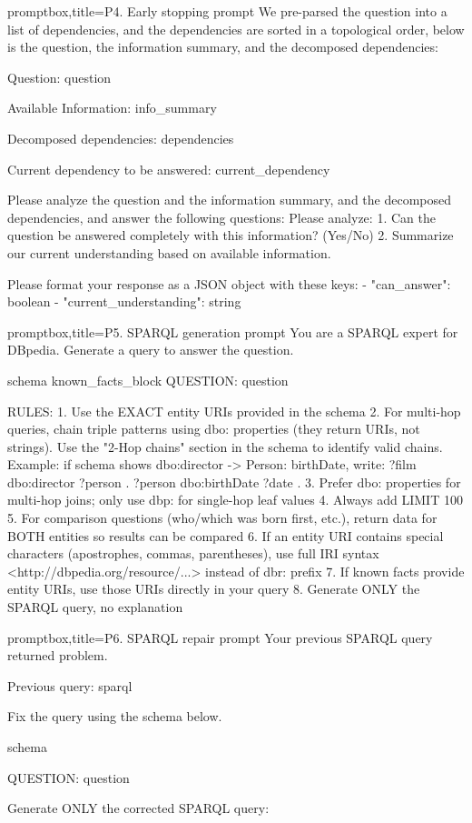 \documentclass[11pt]{article}
\begin{document}
\begin{tcblisting}{promptbox,title={P4. Early stopping prompt}}
We pre-parsed the question into a list of dependencies, and the dependencies are sorted in a topological order, below is the question, the information summary, and the decomposed dependencies:

Question: {question}

Available Information:
{info_summary}

Decomposed dependencies:
{dependencies}

Current dependency to be answered:
{current_dependency}

Please analyze the question and the information summary, and the decomposed dependencies, and answer the following questions:
Please analyze:
1. Can the question be answered completely with this information? (Yes/No)
2. Summarize our current understanding based on available information.

Please format your response as a JSON object with these keys:
- "can_answer": boolean
- "current_understanding": string
\end{tcblisting}

\begin{tcblisting}{promptbox,title={P5. SPARQL generation prompt}}
You are a SPARQL expert for DBpedia. Generate a query to answer the question.

{schema}
{known_facts_block}
QUESTION: {question}

RULES:
1. Use the EXACT entity URIs provided in the schema
2. For multi-hop queries, chain triple patterns using dbo: properties (they return URIs, not strings).
   Use the "2-Hop chains" section in the schema to identify valid chains.
   Example: if schema shows dbo:director -> Person: birthDate, write:
   ?film dbo:director ?person . ?person dbo:birthDate ?date .
3. Prefer dbo: properties for multi-hop joins; only use dbp: for single-hop leaf values
4. Always add LIMIT 100
5. For comparison questions (who/which was born first, etc.), return data for BOTH entities so results can be compared
6. If an entity URI contains special characters (apostrophes, commas, parentheses), use full IRI syntax <http://dbpedia.org/resource/...> instead of dbr: prefix
7. If known facts provide entity URIs, use those URIs directly in your query
8. Generate ONLY the SPARQL query, no explanation
\end{tcblisting}

\begin{tcblisting}{promptbox,title={P6. SPARQL repair prompt}}
Your previous SPARQL query returned {problem}.

Previous query:
{sparql}

Fix the query using the schema below.

{schema}

QUESTION: {question}

Generate ONLY the corrected SPARQL query:
\end{tcblisting}
\end{document}
